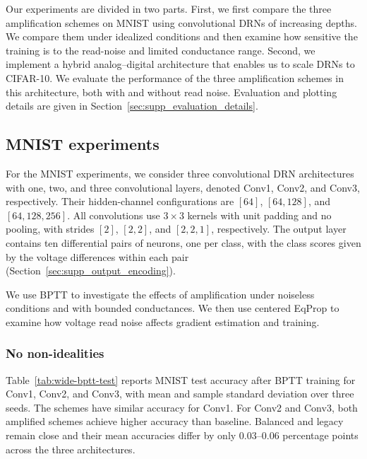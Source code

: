 \documentclass{article}
\begin{document}
Our experiments are divided in two parts. First, we first compare the three amplification schemes on MNIST using convolutional DRNs of increasing depths. We compare them under idealized conditions and then examine how sensitive the training is to the read-noise and limited conductance range. Second, we implement a hybrid analog--digital architecture that enables us to scale DRNs to CIFAR-10. We evaluate the performance of the three amplification schemes in this architecture, both with and without read noise.
Evaluation and plotting details are given in Section~\ref{sec:supp_evaluation_details}.





\subsection{MNIST experiments}
\label{sec:mnist_experiments}

For the MNIST experiments, we consider three convolutional DRN
architectures with one, two, and three convolutional layers,
denoted Conv1, Conv2, and Conv3, respectively.
Their hidden-channel configurations are $[64]$, $[64,128]$,
and $[64,128,256]$. All convolutions use $3\times3$ kernels
with unit padding and no pooling, with strides $[2]$,
$[2,2]$, and $[2,2,1]$, respectively.
The output layer contains ten differential pairs of neurons,
one per class, with the class scores given by the voltage
differences within each pair
(Section~\ref{sec:supp_output_encoding}).

We use BPTT to investigate the effects of amplification under
noiseless conditions and with bounded conductances. We then
use centered EqProp to examine how voltage read noise
affects gradient estimation and training.

\subsubsection{No non-idealities}
\label{sec:wide_bptt_eqprop_results}

Table~\ref{tab:wide-bptt-test} reports MNIST test accuracy
after BPTT training for Conv1, Conv2, and Conv3, with mean
and sample standard deviation over three seeds. The schemes have similar accuracy for Conv1. For Conv2 and Conv3, both amplified schemes achieve higher accuracy than baseline. Balanced and legacy remain close and their mean accuracies differ by only $0.03$--$0.06$ percentage points across the three architectures.
\end{document}
